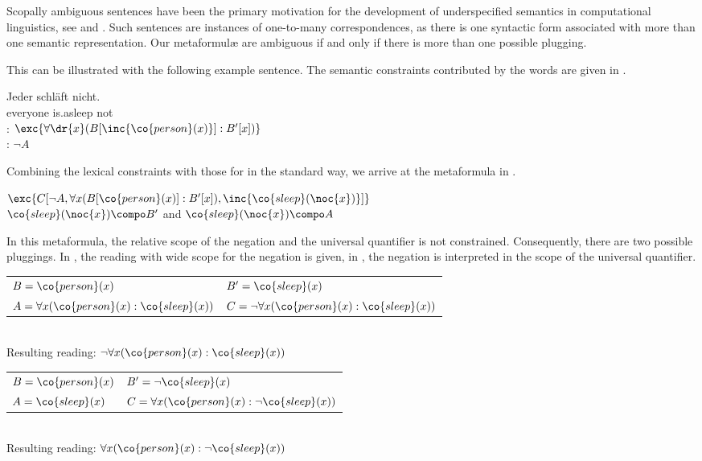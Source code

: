 \documentclass[output=paper]{langsci/langscibook}
\begin{document}
Scopally ambiguous sentences have been the primary motivation for the development of underspecified semantics in computational linguistics, see \citet{Pinkal:95} and \citet{Bos:96}. 
Such sentences are instances of one-to-many correspondences, as there is one syntactic form associated with more than one semantic representation.  
Our metaformulæ are ambiguous if and only if there is more than one possible plugging. 

This can be illustrated with the following example sentence. The semantic constraints contributed by the words are given in .

\ea
\gll Jeder schläft nicht.\\
everyone is.asleep not\\
\glt {}
\ex \label{every-not-le}
: $\exc{\forall \dr{x}(B[\inc{\co{person}(x)}]:B'[x])}$\\
: $\lnot A$
\z

Combining the lexical constraints with those for  in the standard way, we arrive at the metaformula in .

\ea \label{every-not-lf}
$\exc{C[\lnot A, \forall x (B[\co{person}(x)] : B'[x]), \inc{\co{sleep}(\noc{x})}]}$\\
$\co{sleep}(\noc{x}) \compo B'$
and
$\co{sleep}(\noc{x}) \compo A$
\z

In this metaformula, the relative scope of the negation and the universal quantifier is not constrained. Consequently, there are two possible pluggings. In , the reading with wide scope for the negation is given, in , the negation is interpreted in the scope of the universal quantifier.

\ea \label{every-not-plug-wide}
\begin{tabular}[t]{ll}
$B = \co{person}(x)$ & 
$B' = \co{sleep}(x)$\\
$A = \forall x (\co{person}(x): \co{sleep}(x))$ & 
$C = \lnot \forall x (\co{person}(x): \co{sleep}(x))$
\end{tabular}\\
Resulting reading: $\lnot \forall x (\co{person}(x) : \co{sleep}(x))$
\ex \label{every-not-plug-narrow}
\begin{tabular}[t]{ll}
$B = \co{person}(x)$ & 
$B' = \lnot \co{sleep}(x)$\\
$A = \co{sleep}(x)$ & 
$C = \forall x (\co{person}(x): \lnot \co{sleep}(x))$
\end{tabular}\\
Resulting reading: $\forall x (\co{person}(x) : \lnot \co{sleep}(x))$
\z 
\end{document}
